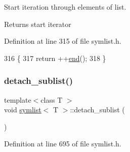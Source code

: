 Start iteration through elements of list. 

\begin{DoxyReturn}{Returns}
start iterator 
\end{DoxyReturn}


Definition at line 315 of file symlist.\+h.


\begin{DoxyCode}
316     \{
317     \textcolor{keywordflow}{return} ++\mbox{\hyperlink{classsymlist_a7283589fa01f79d722f8256d7a6a7883}{end}}();
318     \}
\end{DoxyCode}
\mbox{\label{classsymlist_a784f81bf9dfbfc1865f188a82681779f}} 
\subsubsection{\texorpdfstring{detach\+\_\+sublist()}{detach\_sublist()}}
{\footnotesize\ttfamily template$<$class T $>$ \\
void \mbox{\hyperlink{classsymlist}{symlist}}$<$ T $>$\+::detach\+\_\+sublist (\begin{DoxyParamCaption}{ }\end{DoxyParamCaption})}



Definition at line 695 of file symlist.\+h.


